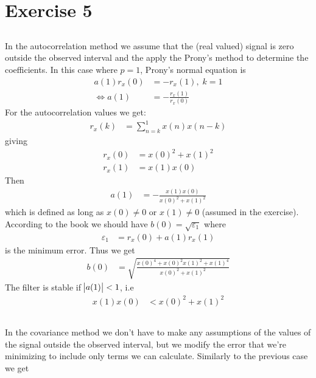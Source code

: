 
\section*{Exercise 5}

\subsection{}
In the autocorrelation method we assume that the (real valued) signal is zero outside
the observed interval and the apply the Prony's method to determine the coefficients.
In this case where $p=1$, Prony's normal equation is
\begin{align}
		a(1)r_x(0)&=-r_x(1),\;k=1\\
		\Leftrightarrow a(1)&=-\frac{r_x(1)}{r_x(0)}
\end{align}
For the autocorrelation values we get:
\begin{align}
	r_x(k)&=\sum_{n=k}^1 x(n)x(n-k)	
\end{align}
giving
\begin{align}
	r_x(0)&=x(0)^2+x(1)^2\\
	r_x(1)&=x(1)x(0)	
\end{align}
Then
\begin{align}
	a(1)&=-\frac{x(1)x(0)}{x(0)^2+x(1)^2}	
\end{align}
which is defined as long as $x(0)\neq 0 $ or $x(1)\neq 0 $ (assumed in the exercise).  
According to the book we should have $b(0)=\sqrt{\varepsilon_1}$
where 
\begin{align}
	\varepsilon_1&=r_x(0)+a(1)r_x(1)	
\end{align}
is the minimum error. Thus we get
\begin{align}
	b(0)&=\sqrt{\frac{x(0)^4+x(0)^2x(1)^2+x(1)^4}{x(0)^2+x(1)^2}}	
\end{align}
The filter is stable if $\abs{a(1)}<1$, i.e
\begin{align}
		x(1)x(0) &< x(0)^2+x(1)^2
\end{align}

\subsection{}

In the covariance method we don't have to make any assumptions
of the values of the signal outside the observed interval, but we
modify the error that we're minimizing to include only terms we can
calculate. Similarly to the previous case we get

